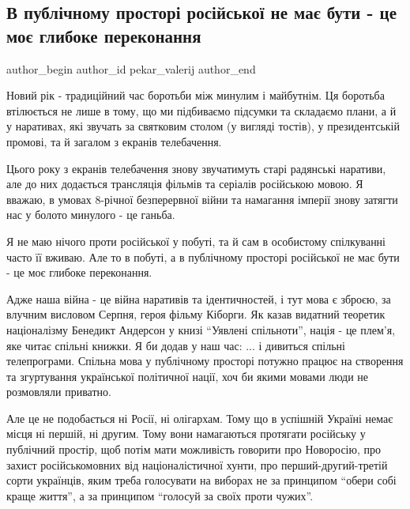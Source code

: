  
 
 
 
 
 
\subsection{В публічному просторі російської не має бути - це моє глибоке переконання}
\label{sec:30_12_2021.fb.pekar_valerij.1.mova_jazyk_public}
 
\ifcmt
 author_begin
   author_id pekar_valerij
 author_end
\fi

Новий рік - традиційний час боротьби між минулим і майбутнім. Ця боротьба
втілюється не лише в тому, що ми підбиваємо підсумки та складаємо плани, а й у
наративах, які звучать за святковим столом (у вигляді тостів), у президентській
промові, та й загалом з екранів телебачення.

Цього року з екранів телебачення знову звучатимуть старі радянські наративи,
але до них додається трансляція фільмів та серіалів російською мовою. Я вважаю,
в умовах 8-річної безперервної війни та намагання імперії знову затягти нас у
болото минулого - це ганьба.

Я не маю нічого проти російської у побуті, та й сам в особистому спілкуванні
часто її вживаю. Але то в побуті, а в публічному просторі російської не має
бути - це моє глибоке переконання.

Адже наша війна - це війна наративів та ідентичностей, і тут мова є зброєю, за
влучним висловом Серпня, героя фільму Кіборги. Як казав видатний теоретик
націоналізму Бенедикт Андерсон у книзі \enquote{Уявлені спільноти}, нація - це плем'я,
яке читає спільні книжки. Я би додав у наш час: ... і дивиться спільні
телепрограми. Спільна мова у публічному просторі потужно працює на створення та
згуртування української політичної нації, хоч би якими мовами люди не
розмовляли приватно.

Але це не подобається ні Росії, ні олігархам. Тому що в успішній Україні немає
місця ні першій, ні другим. Тому вони намагаються протягати російську у
публічний простір, щоб потім мати можливість говорити про Новоросію, про захист
російськомовних від націоналістичної хунти, про перший-другий-третій сорти
українців, яким треба голосувати на виборах не за принципом \enquote{обери собі краще
життя}, а за принципом \enquote{голосуй за своїх проти чужих}.

